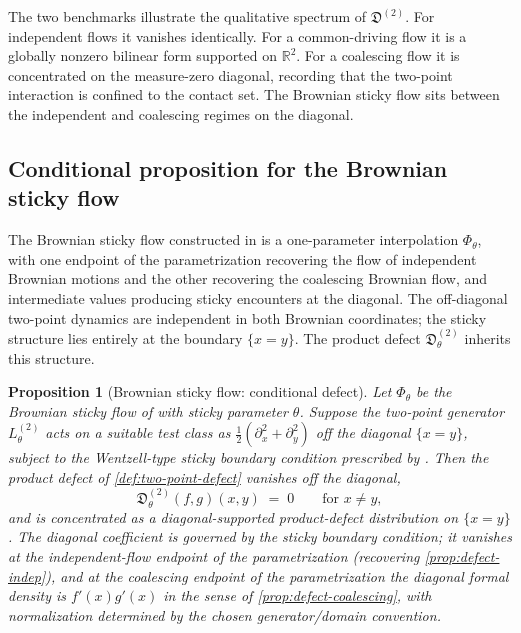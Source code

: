 \documentclass[11pt,reqno]{amsart}
\theoremstyle{plain}
\newtheorem{proposition}[theorem]{Proposition}
\theoremstyle{definition}
\theoremstyle{remark}
\newcommand{\R}{\mathbb{R}}
\begin{document}
The two benchmarks illustrate the qualitative spectrum of
$\mathfrak D^{(2)}$. For independent flows it vanishes identically.
For a common-driving flow it is a globally nonzero bilinear form
supported on $\R^2$. For a coalescing flow it is concentrated on
the measure-zero diagonal, recording that the two-point interaction
is confined to the contact set. The Brownian sticky flow sits
between the independent and coalescing regimes on the diagonal.

\subsection{Conditional proposition for the Brownian sticky flow}\label{sec:twopoint-sticky}

The Brownian sticky flow constructed in \cite{LeJanRaimond2004} is
a one-parameter interpolation $\Phi_{\theta}$, with one endpoint of
the parametrization recovering the flow of independent Brownian
motions and the other recovering the coalescing Brownian flow, and
intermediate values producing sticky encounters at the diagonal.
The off-diagonal two-point dynamics are independent in both Brownian
coordinates; the sticky structure lies entirely at the boundary
$\{x=y\}$. The product defect $\mathfrak D^{(2)}_{\theta}$ inherits
this structure.

\begin{proposition}[Brownian sticky flow: conditional defect]\label{prop:defect-sticky}
Let $\Phi_{\theta}$ be the Brownian sticky flow of
\cite{LeJanRaimond2004} with sticky parameter $\theta$. Suppose
the two-point generator $L^{(2)}_{\theta}$ acts on a suitable test
class as $\tfrac{1}{2}(\partial_x^2+\partial_y^2)$ off the diagonal
$\{x=y\}$, subject to the Wentzell-type sticky boundary condition
prescribed by \cite{LeJanRaimond2004}. Then the product defect of
\cref{def:two-point-defect} vanishes off the diagonal,
\begin{equation}\label{eq:defect-sticky-offdiag}
  \mathfrak D^{(2)}_{\theta}(f,g)(x,y)\;=\;0\qquad\text{for }x\neq y,
\end{equation}
and is concentrated as a diagonal-supported product-defect
distribution on $\{x=y\}$. The diagonal coefficient is governed by
the sticky boundary condition; it vanishes at the independent-flow
endpoint of the parametrization (recovering
\cref{prop:defect-indep}), and at the coalescing endpoint of the
parametrization the diagonal formal density is $f'(x)g'(x)$ in the
sense of \cref{prop:defect-coalescing}, with normalization
determined by the chosen generator/domain convention.
\end{proposition}
\end{document}
